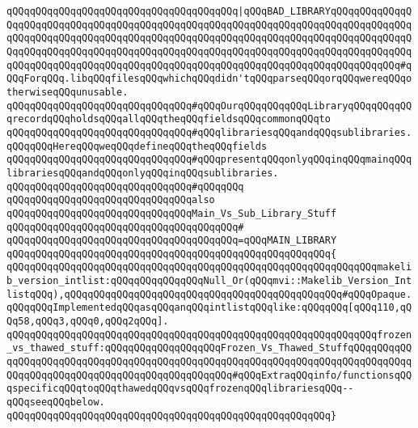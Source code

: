 \verb|qQQqqQQqqQQqqQQqqQQqqQQqqQQqqQQqqQQqqQQq|\verb#|qQQqBAD_LIBRARYqQQqqQQqqQQqqQQqqQQqqQQqqQQqqQQqqQQqqQQqqQQqqQQqqQQqqQQqqQQqqQQqqQQqqQQqqQQqqQQqqQQqqQQqqQQqqQQqqQQqqQQqqQQqqQQqqQQqqQQqqQQqqQQqqQQqqQQqqQQqqQQqqQQqqQQqqQQqqQQqqQQqqQQqqQQqqQQqqQQqqQQqqQQqqQQqqQQqqQQqqQQqqQQqqQQqqQQqqQQqqQQqqQQqqQQqqQQqqQQqqQQqqQQqqQQqqQQqqQQqqQQqqQQqqQQqqQQqqQQqqQQqqQQqqQQq#\verb|#qQQqForqQQq.libqQQqfilesqQQqwhichqQQqdidn'tqQQqparseqQQqorqQQqwereqQQqotherwiseqQQqunusable.|\newline
\newline
\newline
\verb|qQQqqQQqqQQqqQQqqQQqqQQqqQQqqQQq#qQQqOurqQQqqQQqqQQqLibraryqQQqqQQqqQQqrecordqQQqholdsqQQqallqQQqtheqQQqfieldsqQQqcommonqQQqto|\newline
\verb|qQQqqQQqqQQqqQQqqQQqqQQqqQQqqQQq#qQQqlibrariesqQQqandqQQqsublibraries.qQQqqQQqHereqQQqweqQQqdefineqQQqtheqQQqfields|\newline
\verb|qQQqqQQqqQQqqQQqqQQqqQQqqQQqqQQq#qQQqpresentqQQqonlyqQQqinqQQqmainqQQqlibrariesqQQqandqQQqonlyqQQqinqQQqsublibraries.|\newline
\verb|qQQqqQQqqQQqqQQqqQQqqQQqqQQqqQQq#qQQqqQQq|\newline
\verb|qQQqqQQqqQQqqQQqqQQqqQQqqQQqqQQqalso|\newline
\verb|qQQqqQQqqQQqqQQqqQQqqQQqqQQqqQQqMain_Vs_Sub_Library_Stuff|\newline
\verb|qQQqqQQqqQQqqQQqqQQqqQQqqQQqqQQqqQQqqQQq#|\newline
\verb|qQQqqQQqqQQqqQQqqQQqqQQqqQQqqQQqqQQqqQQq=qQQqMAIN_LIBRARY|\newline
\verb|qQQqqQQqqQQqqQQqqQQqqQQqqQQqqQQqqQQqqQQqqQQqqQQqqQQqqQQq{|\newline
\verb|qQQqqQQqqQQqqQQqqQQqqQQqqQQqqQQqqQQqqQQqqQQqqQQqqQQqqQQqqQQqqQQqmakelib_version_intlist:qQQqqQQqqQQqqQQqNull_Or(qQQqmvi::Makelib_Version_IntlistqQQq),qQQqqQQqqQQqqQQqqQQqqQQqqQQqqQQqqQQqqQQqqQQqqQQq#qQQqOpaque.qQQqqQQqImplementedqQQqasqQQqanqQQqintlistqQQqlike:qQQqqQQq[qQQq110,qQQq58,qQQq3,qQQq0,qQQq2qQQq].|\newline
\verb|qQQqqQQqqQQqqQQqqQQqqQQqqQQqqQQqqQQqqQQqqQQqqQQqqQQqqQQqqQQqqQQqfrozen_vs_thawed_stuff:qQQqqQQqqQQqqQQqqQQqFrozen_Vs_Thawed_StuffqQQqqQQqqQQqqQQqqQQqqQQqqQQqqQQqqQQqqQQqqQQqqQQqqQQqqQQqqQQqqQQqqQQqqQQqqQQqqQQqqQQqqQQqqQQqqQQqqQQqqQQqqQQqqQQqqQQqqQQq#qQQqExtraqQQqinfo/functionsqQQqspecificqQQqtoqQQqthawedqQQqvsqQQqfrozenqQQqlibrariesqQQq--qQQqseeqQQqbelow.|\newline
\verb|qQQqqQQqqQQqqQQqqQQqqQQqqQQqqQQqqQQqqQQqqQQqqQQqqQQqqQQq}|\newline
